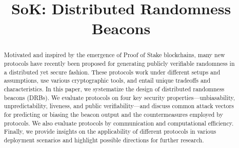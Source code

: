


\title{SoK: Distributed Randomness Beacons}



\maketitle
\thispagestyle{plain}
\pagestyle{plain}
\begin{abstract}
    Motivated and inspired by the emergence of Proof of Stake blockchains, many new protocols have recently been proposed for generating publicly verifiable randomness in a distributed yet secure fashion. These protocols work under different setups and assumptions, use various cryptographic tools, and entail unique tradeoffs and characteristics. In this paper, we systematize the design of distributed randomness beacons (DRBs).
    We evaluate protocols on four key security properties---unbiasability, unpredictability, liveness, and public verifiability---and discuss common attack vectors for predicting or biasing the beacon output and the countermeasures employed by protocols. We also evaluate protocols by communication and computational efficiency.
    Finally, we provide insights on the applicability of different protocols in various deployment scenarios and highlight possible directions for further research.
\end{abstract}



\pagebreak

\appendix



